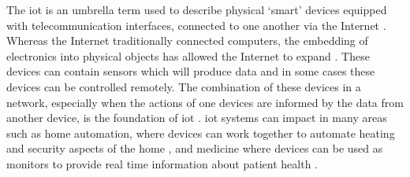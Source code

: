 The \acrfull{iot} is an umbrella term used to describe physical `smart' devices
equipped with telecommunication interfaces, connected to one another via the 
Internet \citep{centenaro_long-range_2016}.
Whereas the Internet traditionally connected computers, the embedding of 
electronics into physical objects has allowed the Internet to expand \citep{miorandi_internet_2012}.
These devices can contain sensors which will produce data and in some cases 
these devices can be controlled remotely. The combination of these devices in
a network, especially when the actions of one devices are informed by the 
data from another device, is the foundation of \gls{iot} \citep{minerva_towards_2015}.
\gls{iot} systems can impact in many areas such as home automation,
where devices can work together to automate heating and security aspects of 
the home \citep{lee_internet_2018}, and medicine where devices
can be used as monitors to provide real time information about 
patient health \citep{kumar_iot_2016}.
